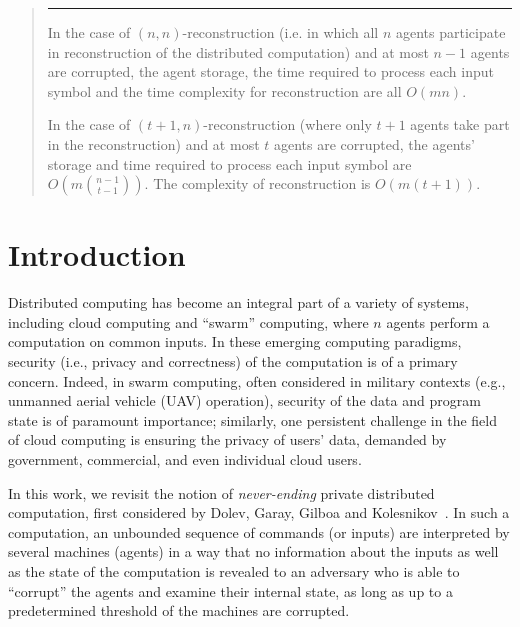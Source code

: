 \documentclass[letterpaper,11pt]{article}
\newlength{\saveparindent}
\newlength{\saveparskip}
\newenvironment{tiret}{\begin{list}{\hspace{1pt}\rule[0.5ex]{6pt}{1pt}\hfill}{\labelwidth=15pt\labelsep=3pt \leftmargin=18pt \topsep=1pt\setlength{\listparindent}{\saveparindent}\setlength{\parsep}{\saveparskip}\setlength{\itemsep}{1pt}}}{\end{list}}
\begin{document}
\begin{titlepage}
\begin{abstract}
\begin{tiret}

\item In the case of $(n,n)$-reconstruction (i.e. in which all $n$
agents participate in reconstruction of the distributed computation) and at most $n-1$ agents are corrupted,
the agent storage, the time required to process each input symbol and the time complexity for reconstruction are all $O(mn)$. 

\item In the case of $(t+1,n)$-reconstruction (where only $t+1$ agents 
take part in the reconstruction) and at most $t$ agents are corrupted,
the agents' storage and time required to process each input symbol are $O(m{n-1 \choose t-1})$. The complexity of reconstruction is $O(m(t+1))$.

\end{tiret}
\end{abstract}


\end{titlepage}
\clearpage
{} 


\section{Introduction}

Distributed computing has become an integral part of a variety of
systems, including cloud computing and ``swarm'' computing, where $n$
agents perform a computation
on common inputs.  In these emerging computing paradigms, security
(i.e., privacy and correctness) of the computation is of a primary
concern.  Indeed, in
swarm computing, often considered in military contexts (e.g., unmanned
aerial vehicle (UAV) operation), security 
of the data and program state is of paramount importance;
similarly, one persistent challenge in the field of cloud
computing is ensuring the privacy of users' data, demanded by
government, commercial, and even individual cloud users.

In this work, we revisit the notion of {\em never-ending}
private distributed computation, first considered by Dolev, Garay, Gilboa and
Kolesnikov~\cite{DGGK11}. In such a computation, an unbounded sequence
of commands (or inputs) are interpreted by several machines (agents) in 
a way that no information about the inputs as well as the state of
the computation is revealed to an adversary who is able to ``corrupt''
the agents and examine their internal state, as long as up to a predetermined
threshold of the machines are corrupted.
\end{document}
